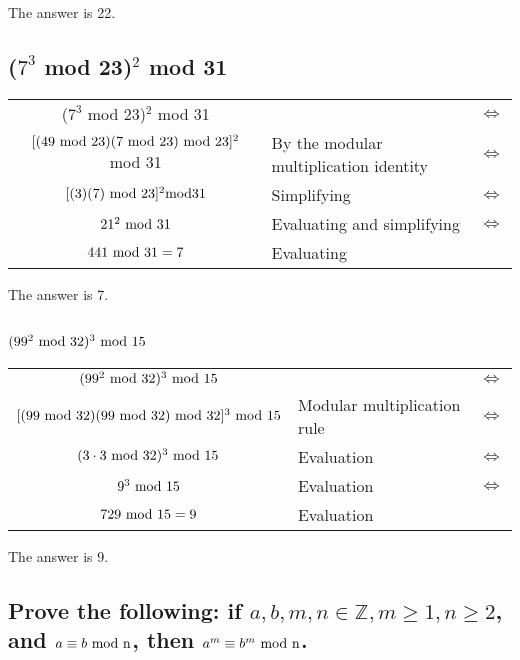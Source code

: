 \documentclass{article}
\begin{document}
The answer is 22.

\subsection{($7^3$ mod 23)$^2$ mod 31}
\begin{center}
\begin{tabular}{clc}
($7^3$ mod 23)$^2$ mod 31 & & $\iff$ \\
$[(49 ~\rm{mod}~ 23)(7 ~\rm{mod}~ 23) ~\rm{mod}~ 23]^2$ mod 31 & By the modular multiplication identity & $\iff$ \\
$[(3)(7) ~\rm{mod}~ 23]^2 mod 31$ & Simplifying & $\iff$ \\
$21^2 ~\rm{mod}~ 31$ & Evaluating and simplifying & $\iff$ \\
$441 ~\rm{mod}~ 31 = 7$ & Evaluating
\end{tabular}
\end{center}

The answer is 7.

\subsection{$(99^2 ~\rm{mod}~ 32)^3 ~\rm{mod}~ 15$}

\begin{center}
\begin{tabular}{clc}
$(99^2 ~\rm{mod}~ 32)^3 ~\rm{mod}~ 15$ & & $\iff$ \\
$[(99 ~\rm{mod}~ 32)(99 ~\rm{mod}~ 32) ~\rm{mod}~ 32]^3 ~\rm{mod}~ 15$ & Modular multiplication rule & $\iff$ \\
$(3\cdot 3 ~\rm{mod}~ 32)^3 ~\rm{mod}~ 15$ & Evaluation & $\iff$ \\
$9^3 ~\rm{mod}~ 15$ & Evaluation & $\iff$ \\
$729 ~\rm{mod}~ 15 = 9$ & Evaluation
\end{tabular}
\end{center}

The answer is 9.

\subsection{Prove the following: if $a,b,m,n \in \mathbb{Z}, m \geq 1, n \geq 2$, and $a \equiv b ~\rm{mod}~ n$, then $a^m \equiv b^m ~\rm{mod}~ n$.}
\end{document}
